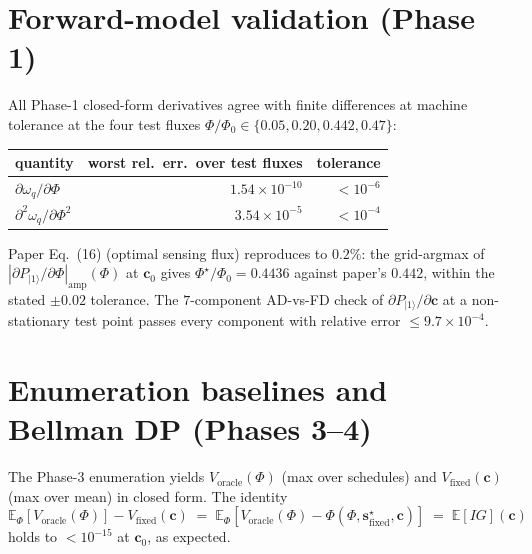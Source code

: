 \documentclass[11pt,a4paper]{article}
\newcommand{\E}{\mathbb{E}}
\newcommand{\Phizero}{\Phi_0}
\begin{document}
\section{Forward-model validation (Phase 1)}
\label{sec:phase1}

All Phase-1 closed-form derivatives agree with finite differences at machine tolerance at the four test fluxes $\Phi/\Phizero \in \{0.05, 0.20, 0.442, 0.47\}$:
\begin{center}
\begin{tabular}{@{}lrr@{}}
\toprule
quantity & worst rel.\ err.\ over test fluxes & tolerance \\
\midrule
$\partial \omega_q/\partial \Phi$   & $1.54\!\times\!10^{-10}$ & $<10^{-6}$ \\
$\partial^2 \omega_q/\partial\Phi^2$ & $3.54\!\times\!10^{-5}$ & $<10^{-4}$ \\
\bottomrule
\end{tabular}
\end{center}
Paper Eq.~(16) (optimal sensing flux) reproduces to $0.2\%$: the grid-argmax of $|\partial P_{|1\rangle}/\partial\Phi|_{\text{amp}}(\Phi)$ at $\bm c_0$ gives $\Phi^\star/\Phizero = 0.4436$ against paper's $0.442$, within the stated $\pm 0.02$ tolerance.  The $7$-component AD-vs-FD check of $\partial P_{|1\rangle}/\partial \bm c$ at a non-stationary test point passes every component with relative error $\le 9.7\!\times\!10^{-4}$.

\section{Enumeration baselines and Bellman DP (Phases 3--4)}
\label{sec:enum_bellman}

The Phase-3 enumeration yields $V_{\text{oracle}}(\Phi)$ (max over schedules) and $V_{\text{fixed}}(\bm c)$ (max over mean) in closed form.  The identity
\begin{equation}
  \E_\Phi[V_{\text{oracle}}(\Phi)] - V_{\text{fixed}}(\bm c) \;=\; \E_\Phi\!\left[ V_{\text{oracle}}(\Phi) - \Phi(\Phi, \bm s^\star_{\text{fixed}}, \bm c)\right] \;=\; \E[IG](\bm c)
\end{equation}
holds to $< 10^{-15}$ at $\bm c_0$, as expected.
\end{document}
